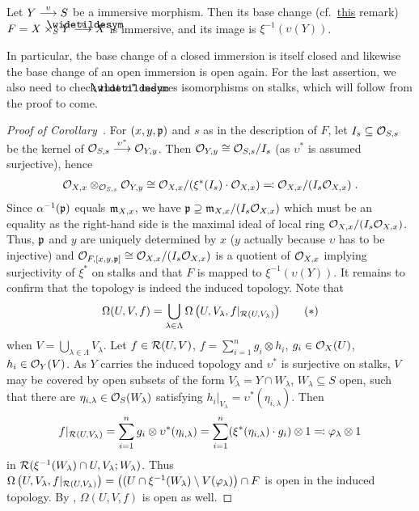 \documentclass[a4paper,parskip=half,numbers=enddot, DIV=12]{scrreprt}
\begin{document}
\begin{cor}
    Let $Y\morphism[\upsilon]S$ be a immersive morphism. Then its base change (cf.\ \hyperref[rem:baseChange]{this} remark) $F=X\times_SY\morphism[\snake \upsilon] X$ is immersive, and its image is $\xi^{-1}(\upsilon(Y))$.
\end{cor}
\begin{rem*}
	 In particular, the base change of a closed immersion is itself closed and likewise the base change of an open immersion is open again. For the last assertion, we also need to check that $\snake{\upsilon}^*$ induces isomorphisms on stalks, which will follow from the proof to come.
\end{rem*}
\begin{proof}[Proof of Corollary~]
    For $(x,y,\mathfrak{p})$ and $s$ as in the description of $F$, let $I_s\subseteq \mathcal{O}_{S,s}$ be the kernel of $\Oo_{S,s}\morphism[\upsilon^*] \Oo_{Y,y}$. Then $\mathcal{O}_{Y,y}\cong \mathcal{O}_{S,s}/I_s$ (as $\upsilon^*$ is assumed surjective), hence 
    \begin{align*}
    	\mathcal{O}_{X,x}\otimes_{\mathcal{O}_{S,s}}\mathcal{O}_{Y,y} \cong \mathcal{O}_{X,x}/(\xi^*(I_s) \cdot \mathcal{O}_{X,x}) \eqqcolon \mathcal{O}_{X,x}/(I_s\mathcal{O}_{X,x})\;. 
    \end{align*}
    Since $\alpha^{-1}(\mathfrak{p})$ equals $\mathfrak{m}_{X,x}$, we have $\mathfrak{p}\supseteq \mathfrak{m}_{X,x}/(I_s \mathcal{O}_{X,x})$ which must be an equality as the right-hand side is the maximal ideal of local ring $\mathcal{O}_{X,x}/(I_s \mathcal{O}_{X,x})$. Thus, $\mathfrak{p}$ and $y$ are uniquely determined by $x$ ($y$ actually because $\upsilon$ has to be injective) and $\mathcal{O}_{F,[x,y,\mathfrak{p}]}\cong \mathcal{O}_{X,x}/(I_s \mathcal{O}_{X,x})$ is a quotient of $\mathcal{O}_{X,x}$ implying surjectivity of $\xi^*$ on stalks and that $F$ is mapped to $\xi^{-1}(\upsilon(Y))$. It remains to confirm that the topology is indeed the induced topology. Note that
    \begin{align}\lbl{eq:omegaCover}
        \Omega(U,V,f) = \bigcup_{\lambda\in \Lambda} \Omega\left(U,V_\lambda, f|_{\Rr(U,V_\lambda)}\right)\tag{$*$}
    \end{align}
    when $V=\bigcup_{\lambda\in \Lambda} V_\lambda$. Let $f\in \mathcal{R}(U,V)$, $f=\sum_{i=1}^n g_i\otimes h_i$, $g_i\in \mathcal{O}_X(U)$, $h_i\in\mathcal{O}_Y(V)$. As $Y$ carries the induced topology and $\upsilon^*$ is surjective on stalks, $V$ may be covered by open subsets of the form $V_\lambda = Y\cap W_\lambda$, $W_\lambda \subseteq S$ open, such that there are $\eta_{i,\lambda}\in \mathcal{O}_S(W_\lambda)$ satisfying $h_i|_{V_\lambda} = \upsilon^*(\eta_{i,\lambda})$. Then
    \begin{align*}
        f|_{\mathcal{R}(U,V_\lambda)} = \sum_{i=1}^n g_i\otimes \upsilon^*(\eta_{i,\lambda}) = \sum_{i=1}^n (\xi^*(\eta_{i,\lambda})\cdot g_i) \otimes 1 \eqqcolon\varphi_\lambda\otimes 1
    \end{align*}
    in $\mathcal{R}(\xi^{-1}(W_\lambda)\cap U, V_\lambda; W_\lambda)$. Thus $\Omega\left(U,V_\lambda, f|_{\mathcal{R}(U,V_\lambda)}\right) = \big((U\cap \xi^{-1}(W_\lambda)\setminus V(\varphi_\lambda)\big)\cap F$ is open in the induced topology. By , $\Omega(U,V,f)$ is open as well.
\end{proof}
\end{document}
